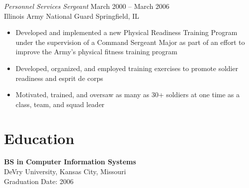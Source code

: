 \documentclass[margin,line]{resume}
\begin{document}
\begin{resume}
{\sl Personnel Services Sergeant}   \hfill   March 2000 -- March 2006\\
Illinois Army National Guard        \hfill   Springfield, IL
\begin{itemize} \itemsep -2pt %
\small\item Developed and implemented a new Physical Readiness Training Program under the supervision of a
            Command Sergeant Major as part of an effort to improve the Army's physical fitness training program
\small\item Developed, organized, and employed training exercises to promote soldier readiness and esprit de corps
\small\item Motivated, trained, and oversaw as many as 30+ soldiers at one time as a class, team, and squad leader
\end{itemize}

\section{Education}
\textbf{BS in Computer Information Systems}\\ DeVry University, Kansas City, Missouri\vspace{1mm}\\\vspace{0mm}%
Graduation Date: 2006

\end{resume}
\end{document}
